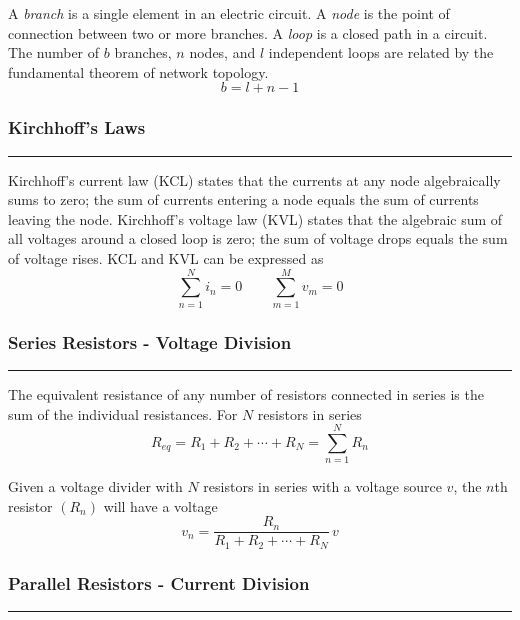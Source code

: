\documentclass{article}
\begin{document}
    \vspace{.2em}\noindent
    A \emph{branch} is a single element in an electric circuit.
    A \emph{node} is the point of connection between two or more branches.
    A \emph{loop} is a closed path in a circuit.
    The number of $b$ branches, $n$ nodes, and $l$ independent loops are related by the fundamental theorem of network topology.
    \[
        b = l+n-1
    \]

    \smallskip
    \subsubsection*{Kirchhoff's Laws}
    \vspace{-1em}
    \rule{\linewidth}{0.1mm}

    \vspace{0.2em}\noindent
    Kirchhoff's current law (KCL) states that the currents at any node algebraically sums to zero; the sum of currents entering a node equals the sum of currents leaving the node.
    Kirchhoff's voltage law (KVL) states that the algebraic sum of all voltages around a closed loop is zero; the sum of voltage drops equals the sum of voltage rises.
    KCL and KVL can be expressed as
    \[
        \sum_{n=1}^N i_n =0 \qquad \sum_{m=1}^M v_m=0
    \]

    \smallskip
    \subsubsection*{Series Resistors - Voltage Division}
    \vspace{-1em}
    \rule{\linewidth}{0.1mm}

    \vspace{.2em}\noindent
    The equivalent resistance of any number of resistors connected in series is the sum of the individual resistances.
    For $N$ resistors in series
    \[
        R_{eq} = R_1 + R_2 + \cdots + R_N = \sum_{n=1}^N R_n
    \]

    \vspace{.2em}\noindent
    Given a voltage divider with $N$ resistors in series with a voltage source $v$, the $n$th resistor $(R_n)$ will have a voltage
    \[
        v_n=\frac{R_n}{R_1+R_2+\cdots+R_N}\,v
    \]

    \smallskip
    \subsubsection*{Parallel Resistors - Current Division}
    \vspace{-1em}
    \rule{\linewidth}{0.1mm}
\end{document}

